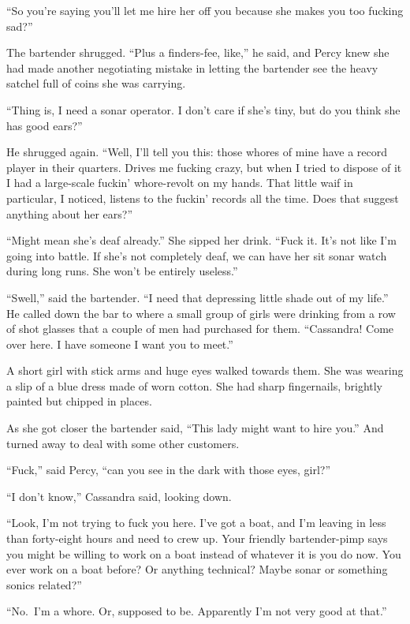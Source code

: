 \documentclass[
]{scrbook}
\begin{document}
``So you're saying you'll let me hire her off you because she makes you
too fucking sad?''

The bartender shrugged. ``Plus a finders-fee, like,'' he said, and Percy
knew she had made another negotiating mistake in letting the bartender
see the heavy satchel full of coins she was carrying.

``Thing is, I need a sonar operator. I don't care if she's tiny, but do
you think she has good ears?''

He shrugged again. ``Well, I'll tell you this: those whores of mine have
a record player in their quarters. Drives me fucking crazy, but when I
tried to dispose of it I had a large-scale fuckin' whore-revolt on my
hands. That little waif in particular, I noticed, listens to the fuckin'
records all the time. Does that suggest anything about her ears?''

``Might mean she's deaf already.'' She sipped her drink. ``Fuck it. It's
not like I'm going into battle. If she's not completely deaf, we can
have her sit sonar watch during long runs. She won't be entirely
useless.''

``Swell,'' said the bartender. ``I need that depressing little shade out
of my life.'' He called down the bar to where a small group of girls
were drinking from a row of shot glasses that a couple of men had
purchased for them. ``Cassandra! Come over here. I have someone I want
you to meet.''

A short girl with stick arms and huge eyes walked towards them. She was
wearing a slip of a blue dress made of worn cotton. She had sharp
fingernails, brightly painted but chipped in places.

As she got closer the bartender said, ``This lady might want to hire
you.'' And turned away to deal with some other customers.

``Fuck,'' said Percy, ``can you see in the dark with those eyes, girl?''

``I don't know,'' Cassandra said, looking down.

``Look, I'm not trying to fuck you here. I've got a boat, and I'm
leaving in less than forty-eight hours and need to crew up. Your
friendly bartender-pimp says you might be willing to work on a boat
instead of whatever it is you do now. You ever work on a boat before? Or
anything technical? Maybe sonar or something sonics related?''

``No.~I'm a whore. Or, supposed to be. Apparently I'm not very good at
that.''
\end{document}
